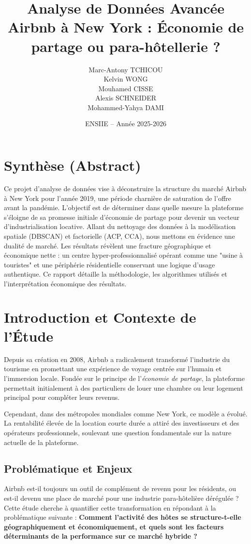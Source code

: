\documentclass[a4paper, 12pt]{article}
\title{\textbf{Analyse de Données Avancée}\\
\Large Airbnb à New York : Économie de partage ou para-hôtellerie ?}
\author{
    Marc-Antony TCHICOU \\
    Kelvin WONG \\
    Mouhamed CISSE \\
    Alexis SCHNEIDER \\
    Mohammed-Yahya DAMI
}
\date{ENSIIE -- Année 2025-2026}
\begin{document}
\maketitle
\thispagestyle{empty}
\newpage

\section*{Synthèse (Abstract)}
Ce projet d'analyse de données vise à déconstruire la structure du marché Airbnb à New York pour l'année 2019, une période charnière de saturation de l'offre avant la pandémie. L'objectif est de déterminer dans quelle mesure la plateforme s'éloigne de sa promesse initiale d'économie de partage pour devenir un vecteur d'industrialisation locative. Allant du nettoyage des données à la modélisation spatiale (DBSCAN) et factorielle (ACP, CCA), nous mettons en évidence une dualité de marché. Les résultats révèlent une fracture géographique et économique nette : un centre hyper-professionnalisé opérant comme une "usine à touristes" et une périphérie résidentielle conservant une logique d'usage authentique. Ce rapport détaille la méthodologie, les algorithmes utilisés et l'interprétation économique des résultats.

\newpage
\tableofcontents
\newpage

\section{Introduction et Contexte de l'Étude}

Depuis sa création en 2008, Airbnb a radicalement transformé l'industrie du tourisme en promettant une expérience de voyage centrée sur l'humain et l'immersion locale. Fondée sur le principe de l'\textit{économie de partage}, la plateforme permettait initialement à des particuliers de louer une chambre ou leur logement principal pour compléter leurs revenus.

Cependant, dans des métropoles mondiales comme New York, ce modèle a évolué. La rentabilité élevée de la location courte durée a attiré des investisseurs et des opérateurs professionnels, soulevant une question fondamentale sur la nature actuelle de la plateforme.

\subsection{Problématique et Enjeux}
Airbnb est-il toujours un outil de complément de revenu pour les résidents, ou est-il devenu une place de marché pour une industrie para-hôtelière dérégulée ?
Cette étude cherche à quantifier cette transformation en répondant à la problématique suivante : \textbf{Comment l'activité des hôtes se structure-t-elle géographiquement et économiquement, et quels sont les facteurs déterminants de la performance sur ce marché hybride ?}
\end{document}
